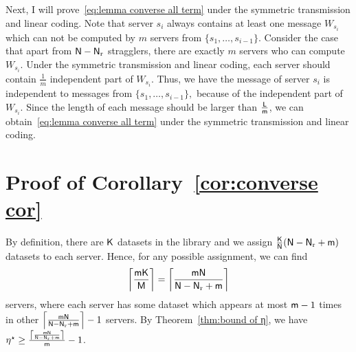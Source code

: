 \documentclass[conference,letterpaper]{IEEEtran}
\begin{document}
Next, I will prove~\eqref{eq:lemma converse all term} under the symmetric transmission and linear coding. Note that server $s_i$ always contains at least one message $W_{s_i}$ which can not be computed by $m$ servers from $\{s_1, \ldots, s_{i-1}\}$.  Consider the case that apart from ${\sf N} - {\sf N}_{\rm r}$ stragglers, there are exactly $m$ servers who can compute $W_{s_i}$. Under the symmetric transmission and linear coding, each server should contain $\frac{1}{m}$ independent part of $W_{s_i}$. Thus, we have the message of server $s_i$ is independent to messages from $\{s_1, \ldots, s_{i-1}\},$ because of the independent part of $W_{s_i}$. Since the length of each message should be larger than $\frac{{\sf L}}{{\sf m}}$, we can obtain~\eqref{eq:lemma converse all term} under the symmetric transmission and linear coding. 

\section{Proof of Corollary~\ref{cor:converse cor}}
\label{sec:cor2 proof} 
By definition, there are ${\sf K}$ datasets in the library and we assign $\frac{{\sf K}}{{\sf N}}({\sf N}-{\sf N}_{\rm r}+{\sf m})$ datasets to
each server.   
Hence, for any possible assignment, we can find 
$$
\left\lceil \frac{{\sf m}{\sf K}}{{\sf M}} \right\rceil= \left\lceil \frac{{\sf m}{\sf N}}{{\sf N}-{\sf N}_{\rm r}+{\sf m}} \right\rceil
$$ servers, where each server has some dataset which appears at most ${\sf m}-1$ times in other $\left\lceil \frac{{\sf m}{\sf N}}{{\sf N}-{\sf N}_{\rm r}+{\sf m}} \right\rceil-1$ servers.  By Theorem~\ref{thm:bound of η}, we have 
 $\eta^{\star} \geq \frac{\left\lceil  \frac{{\sf m}{\sf N}}{{\sf N}-{\sf N}_{\rm r}+{\sf m}} \right\rceil}{{\sf m}} -1 $. 
\end{document}
